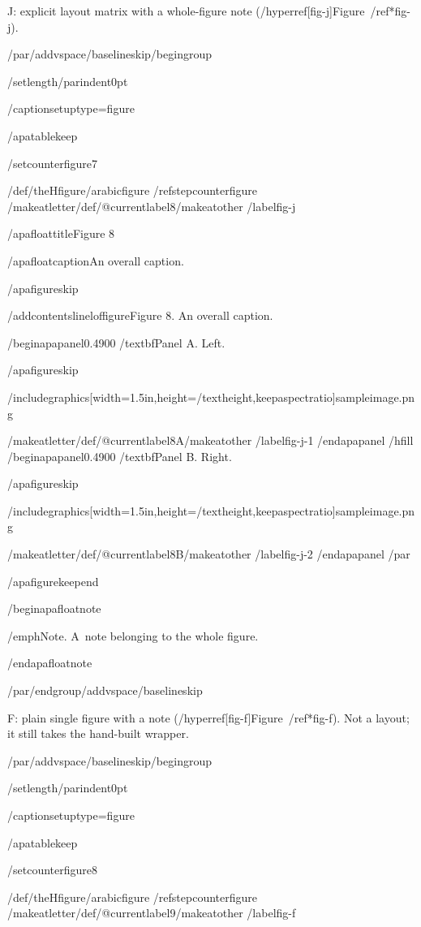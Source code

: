 J: explicit layout matrix with a whole-figure note
(/hyperref[fig-j]{Figure~/ref*{fig-j}}).

/par/addvspace{/baselineskip}/begingroup

/setlength{/parindent}{0pt}

/captionsetup{type=figure}

/apatablekeep

/setcounter{figure}{7}

/def/theHfigure{/arabic{figure}}%
/refstepcounter{figure}%
/makeatletter/def/@currentlabel{8}/makeatother%
/label{fig-j}

/apafloattitle{Figure 8}

/apafloatcaption{An overall caption.}

/apafigureskip

/addcontentsline{lof}{figure}{Figure 8. An overall caption.}

/begin{apapanel}{0.4900}%
/textbf{Panel A}. Left.

/apafigureskip

/includegraphics[width=1.5in,height=/textheight,keepaspectratio]{sampleimage.png}

/makeatletter/def/@currentlabel{8A}/makeatother%
/label{fig-j-1}
/end{apapanel}%
/hfill
/begin{apapanel}{0.4900}%
/textbf{Panel B}. Right.

/apafigureskip

/includegraphics[width=1.5in,height=/textheight,keepaspectratio]{sampleimage.png}

/makeatletter/def/@currentlabel{8B}/makeatother%
/label{fig-j-2}
/end{apapanel}%
/par

/apafigurekeepend

/begin{apafloatnote}

/emph{Note}. A~note belonging to the whole figure.

/end{apafloatnote}

/par/endgroup/addvspace{/baselineskip}

F: plain single figure with a note
(/hyperref[fig-f]{Figure~/ref*{fig-f}}). Not a layout; it still takes
the hand-built wrapper.

/par/addvspace{/baselineskip}/begingroup

/setlength{/parindent}{0pt}

/captionsetup{type=figure}

/apatablekeep

/setcounter{figure}{8}

/def/theHfigure{/arabic{figure}}%
/refstepcounter{figure}%
/makeatletter/def/@currentlabel{9}/makeatother%
/label{fig-f}

